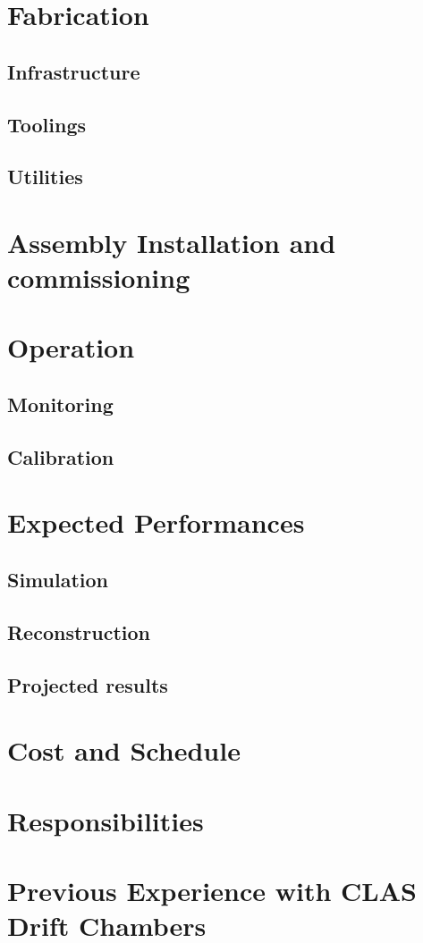 \section{Fabrication}

\subsection{Infrastructure}

\subsection{Toolings}

\subsection{Utilities}

\section{Assembly Installation and commissioning}

\section{Operation}

\subsection{Monitoring}

\subsection{Calibration}


\section{Expected Performances}

\subsection{Simulation}
\subsection{Reconstruction}
\subsection{Projected results}


\section{Cost and Schedule}

\section{Responsibilities}


\newpage

\appendix
\section{Previous Experience with CLAS Drift Chambers}



